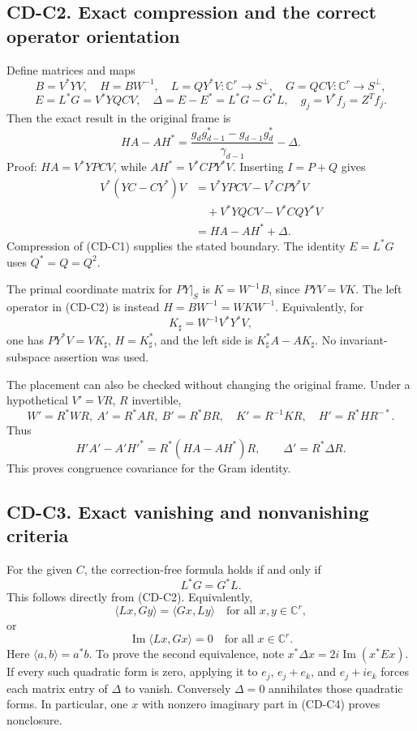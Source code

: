 \documentclass[11pt]{article}
\begin{document}
\subsection{CD-C2. Exact compression and the correct operator orientation}\label{cd-c2.-exact-compression-and-the-correct-operator-orientation}

Define matrices and maps \[
B=V^*YV,\quad H=BW^{-1},\quad
L=QY^*V:\mathbb C^r\to S^\perp,\quad
G=QCV:\mathbb C^r\to S^\perp,
\] \[
E=L^*G=V^*YQCV,\quad
\Delta=E-E^*=L^*G-G^*L,\quad g_j=V^*f_j=Z^Tf_j.
\] Then the exact result in the original frame is \[
\boxed{HA-AH^*
=\frac{g_dg_{d-1}^*-g_{d-1}g_d^*}{\gamma_{d-1}}-\Delta.}
\tag{CD-C2}
\] Proof: \(HA=V^*YPCV\), while \(AH^*=V^*CPY^*V\). Inserting \(I=P+Q\) gives \[
\begin{aligned}
V^*(YC-CY^*)V
&=V^*YPCV-V^*CPY^*V\\
&\quad+V^*YQCV-V^*CQY^*V\\
&=HA-AH^*+\Delta.
\end{aligned}
\] Compression of (CD-C1) supplies the stated boundary. The identity \(E=L^*G\) uses \(Q^*=Q=Q^2\).

The primal coordinate matrix for \(PY|_S\) is \(K=W^{-1}B\), since \(PYV=VK\). The left operator in (CD-C2) is instead \(H=BW^{-1}=WKW^{-1}\). Equivalently, for \[
K_\sharp=W^{-1}V^*Y^*V,
\] one has \(PY^*V=VK_\sharp\), \(H=K_\sharp^*\), and the left side is \(K_\sharp^*A-AK_\sharp\). No invariant-subspace assertion was used.

The placement can also be checked without changing the original frame. Under a hypothetical \(V'=VR\), \(R\) invertible, \[
W'=R^*WR,\ A'=R^*AR,\ B'=R^*BR,\quad
K'=R^{-1}KR,\quad H'=R^*HR^{-*}.
\] Thus \[
H'A'-A'H'^*=R^*(HA-AH^*)R,\qquad \Delta'=R^*\Delta R.
\] This proves congruence covariance for the Gram identity.

\subsection{CD-C3. Exact vanishing and nonvanishing criteria}\label{cd-c3.-exact-vanishing-and-nonvanishing-criteria}

For the given \(C\), the correction-free formula holds if and only if \[
\boxed{L^*G=G^*L.}
\tag{CD-C3}
\] This follows directly from (CD-C2). Equivalently, \[
\langle Lx,Gy\rangle=\langle Gx,Ly\rangle
\quad\text{for all }x,y\in\mathbb C^r,
\] or \[
\operatorname{Im}\langle Lx,Gx\rangle=0
\quad\text{for all }x\in\mathbb C^r.
\tag{CD-C4}
\] Here \(\langle a,b\rangle=a^*b\). To prove the second equivalence, note \(x^*\Delta x=2i\operatorname{Im}(x^*Ex)\). If every such quadratic form is zero, applying it to \(e_j\), \(e_j+e_k\), and \(e_j+ie_k\) forces each matrix entry of \(\Delta\) to vanish. Conversely \(\Delta=0\) annihilates those quadratic forms. In particular, one \(x\) with nonzero imaginary part in (CD-C4) proves nonclosure.
\end{document}
